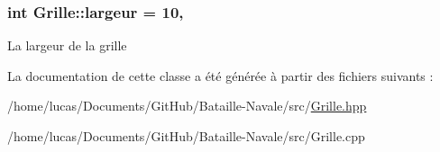 \subsubsection[{\texorpdfstring{largeur}{largeur}}]{\setlength{\rightskip}{0pt plus 5cm}int Grille\+::largeur = 10\hspace{0.3cm}{\ttfamily [static]}, {\ttfamily [private]}}\hypertarget{class_grille_a12252fd7e371af35a0afa6bb12aa4046}{}\label{class_grille_a12252fd7e371af35a0afa6bb12aa4046}
La largeur de la grille 

La documentation de cette classe a été générée à partir des fichiers suivants \+:\begin{DoxyCompactItemize}
\item 
/home/lucas/\+Documents/\+Git\+Hub/\+Bataille-\/\+Navale/src/\hyperlink{_grille_8hpp}{Grille.\+hpp}\item 
/home/lucas/\+Documents/\+Git\+Hub/\+Bataille-\/\+Navale/src/Grille.\+cpp\end{DoxyCompactItemize}
